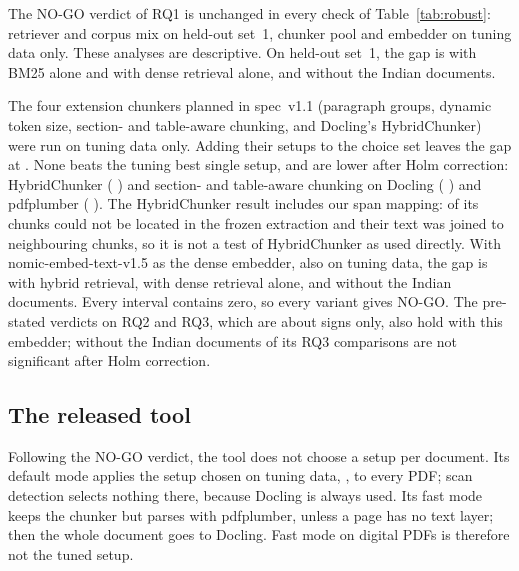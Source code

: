 

The NO-GO verdict of RQ1 is unchanged in every check of
Table~\ref{tab:robust}: retriever and corpus mix on held-out set~1, chunker pool
and embedder on tuning data only. These analyses are descriptive. On held-out
set~1, the gap is \RobBMTwoFiveOnlyHeldOutOneGap{}
\RobBMTwoFiveOnlyHeldOutOneGapCI{} with BM25 alone and
\RobDenseOnlyHeldOutOneGap{} \RobDenseOnlyHeldOutOneGapCI{} with dense
retrieval alone, and \RobWithoutIndianHeldOutOneGap{}
\RobWithoutIndianHeldOutOneGapCI{} without the Indian documents.

The four extension chunkers planned in spec~v1.1 (paragraph groups, dynamic
token size, section- and table-aware chunking, and Docling's HybridChunker)
were run on tuning data only. Adding their \ExtSetups{} setups to the choice set
leaves the gap at \RobExtensionTuningGap{}
\RobExtensionTuningGapCI{}. None beats the tuning best single
setup, and \ExtLower{} are lower after Holm correction: HybridChunker
(\ExtHybridDiff{} \ExtHybridCI{}) and section- and table-aware chunking on
Docling (\ExtSectionDoclingDiff{} \ExtSectionDoclingCI{}) and pdfplumber
(\ExtSectionPdfplumberDiff{} \ExtSectionPdfplumberCI{}). The HybridChunker result
includes our span mapping: \ExtHybridUnlocated{} of its \ExtHybridChunks{} chunks
could not be located in the frozen extraction and their text was joined to
neighbouring chunks, so it is not a test of HybridChunker as used directly. With nomic-embed-text-v1.5 as the
dense embedder, also on tuning data, the gap is
\RobNomicHybridTuningGap{} \RobNomicHybridTuningGapCI{} with hybrid
retrieval, \RobNomicDenseTuningGap{} \RobNomicDenseTuningGapCI{} with dense
retrieval alone, and \RobNomicHybridWOIndianTuningGap{}
\RobNomicHybridWOIndianTuningGapCI{} without the Indian documents. Every
interval contains zero, so every variant gives NO-GO. The pre-stated verdicts on
RQ2 and RQ3, which are about signs only, also hold with this embedder; without
the Indian documents \RobNomicAboveHolm{} of its \RobNomicTests{} RQ3
comparisons are not significant after Holm correction.

\subsection{The released tool}\label{sec:tool}

Following the NO-GO verdict, the tool does not choose a setup per document. Its
default mode applies the setup chosen on tuning data, \RQoneTuningWinner{}, to
every PDF; scan detection selects nothing there, because Docling is always used.
Its fast mode keeps the chunker but parses with pdfplumber, unless a page has no
text layer; then the whole document goes to Docling. Fast mode on digital PDFs
is therefore not the tuned setup.
